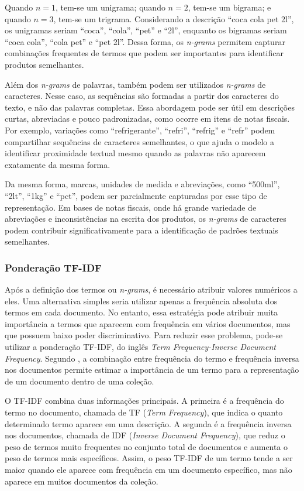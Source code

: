 \documentclass[english,brazilian]{UNISINOSmonografia}
\begin{document}
Quando $n=1$, tem-se um unigrama; quando $n=2$, tem-se um bigrama; e quando $n=3$, tem-se um trigrama. Considerando a descrição ``coca cola pet 2l'', os unigramas seriam ``coca'', ``cola'', ``pet'' e ``2l'', enquanto os bigramas seriam ``coca cola'', ``cola pet'' e ``pet 2l''. Dessa forma, os \textit{n-grams} permitem capturar combinações frequentes de termos que podem ser importantes para identificar produtos semelhantes.

Além dos \textit{n-grams} de palavras, também podem ser utilizados \textit{n-grams} de caracteres. Nesse caso, as sequências são formadas a partir dos caracteres do texto, e não das palavras completas. Essa abordagem pode ser útil em descrições curtas, abreviadas e pouco padronizadas, como ocorre em itens de notas fiscais. Por exemplo, variações como ``refrigerante'', ``refri'', ``refrig'' e ``refr'' podem compartilhar sequências de caracteres semelhantes, o que ajuda o modelo a identificar proximidade textual mesmo quando as palavras não aparecem exatamente da mesma forma.

Da mesma forma, marcas, unidades de medida e abreviações, como ``500ml'', ``2lt'', ``1kg'' e ``pct'', podem ser parcialmente capturadas por esse tipo de representação. Em bases de notas fiscais, onde há grande variedade de abreviações e inconsistências na escrita dos produtos, os \textit{n-grams} de caracteres podem contribuir significativamente para a identificação de padrões textuais semelhantes.

\subsubsection{Ponderação TF-IDF}

Após a definição dos termos ou \textit{n-grams}, é necessário atribuir valores numéricos a eles. Uma alternativa simples seria utilizar apenas a frequência absoluta dos termos em cada documento. No entanto, essa estratégia pode atribuir muita importância a termos que aparecem com frequência em vários documentos, mas que possuem baixo poder discriminativo. Para reduzir esse problema, pode-se utilizar a ponderação TF-IDF, do inglês \textit{Term Frequency-Inverse Document Frequency}. Segundo \cite{ramos2003tfidf}, a combinação entre frequência do termo e frequência inversa nos documentos permite estimar a importância de um termo para a representação de um documento dentro de uma coleção.

O TF-IDF combina duas informações principais. A primeira é a frequência do termo no documento, chamada de TF (\textit{Term Frequency}), que indica o quanto determinado termo aparece em uma descrição. A segunda é a frequência inversa nos documentos, chamada de IDF (\textit{Inverse Document Frequency}), que reduz o peso de termos muito frequentes no conjunto total de documentos e aumenta o peso de termos mais específicos. Assim, o peso TF-IDF de um termo tende a ser maior quando ele aparece com frequência em um documento específico, mas não aparece em muitos documentos da coleção.
\end{document}
